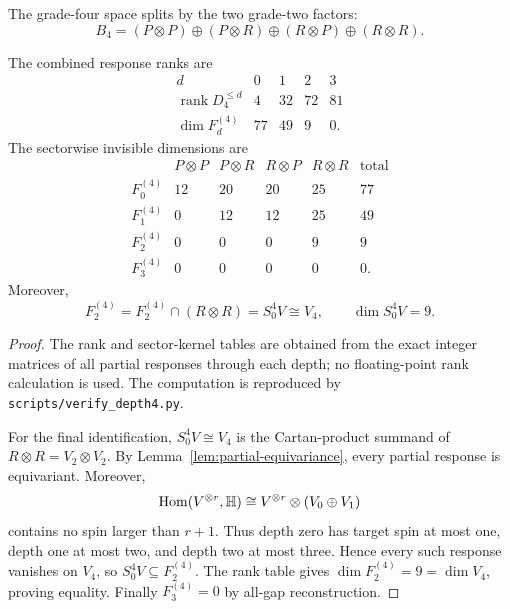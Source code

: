 The grade-four space splits by the two grade-two factors:
\begin{equation}\label{eq:b4-sector}
  B_4=(P\otimes P)\oplus(P\otimes R)\oplus(R\otimes P)\oplus(R\otimes R).
\end{equation}
\begin{proposition}\label{prop:grade-four-table}
The combined response ranks are
\begin{equation}\label{eq:b4-ranks}
\begin{array}{c|cccc}
 d&0&1&2&3\\
 \hline
 \operatorname{rank}D_4^{\le d}&4&32&72&81\\
 \dim F_d^{(4)}&77&49&9&0.
\end{array}
\end{equation}
The sectorwise invisible dimensions are
\begin{equation}\label{eq:b4-sector-table}
\begin{array}{c|rrrr|r}
 &P\otimes P&P\otimes R&R\otimes P&R\otimes R&\text{total}\\
\hline
F_0^{(4)}&12&20&20&25&77\\
F_1^{(4)}&0&12&12&25&49\\
F_2^{(4)}&0&0&0&9&9\\
F_3^{(4)}&0&0&0&0&0.
\end{array}
\end{equation}
Moreover,
\begin{equation}\label{eq:spin-four-survivor}
  F_2^{(4)}=F_2^{(4)}\cap(R\otimes R)=S^4_0V\cong V_4,
  \qquad \dim S^4_0V=9.
\end{equation}
\end{proposition}

\begin{proof}
The rank and sector-kernel tables are obtained from the exact integer matrices of all partial responses through each depth; no floating-point rank calculation is used.  The computation is reproduced by \texttt{scripts/verify\_depth4.py}.

For the final identification, $S^4_0V\cong V_4$ is the Cartan-product summand of
$R\otimes R=V_2\otimes V_2$.  By Lemma~\ref{lem:partial-equivariance}, every partial response is equivariant.  Moreover,
\[
  \operatorname{Hom}(V^{\otimes r},\mathbb H)\cong V^{\otimes r}\otimes(V_0\oplus V_1)
\]
contains no spin larger than $r+1$.  Thus depth zero has target spin at most one, depth one at most two, and depth two at most three.  Hence every such response vanishes on $V_4$, so $S^4_0V\subseteq F_2^{(4)}$.  The rank table gives $\dim F_2^{(4)}=9=\dim V_4$, proving equality.  Finally $F_3^{(4)}=0$ by all-gap reconstruction.
\end{proof}

